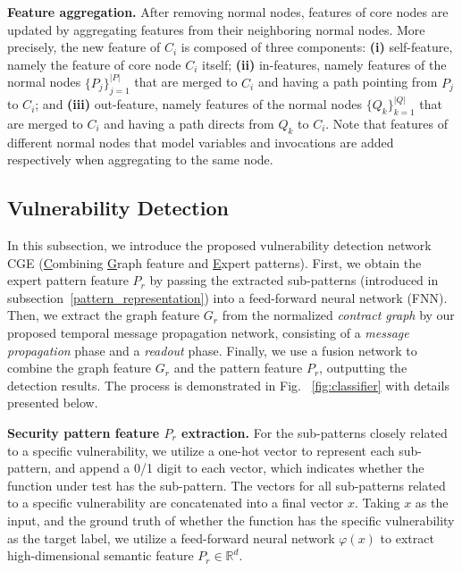 \textbf{Feature aggregation.} After removing normal nodes, features of core nodes are updated by aggregating features from their neighboring normal nodes. More precisely, the new feature of $C_i$ is composed of three components: \textbf{(i)} self-feature, namely the feature of core node $C_i$ itself; \textbf{(ii)} in-features, namely features of the normal nodes $\{P_{j}\}^{|P|}_{j=1}$ that are merged to $C_i$ and having a path pointing from $P_{j}$ to $C_i$; and \textbf{(iii)} out-feature, namely features of the normal nodes $\{Q_{k}\}^{|Q|}_{k=1}$ that are merged to $C_i$ and having a path directs from $Q_{k}$ to $C_i$. Note that features of different normal nodes that model variables and invocations are added respectively when aggregating to the same node.

\vspace{-0.7em}
\subsection{Vulnerability Detection} 
\label{vulnerability_detection}
In this subsection, we introduce the proposed vulnerability detection network CGE (\underline{C}ombining \underline{G}raph feature and \underline{E}xpert patterns). First, we obtain the expert pattern feature $P_{r}$ by passing the extracted sub-patterns (introduced in subsection~\ref{pattern_representation}) into a feed-forward neural network (FNN). Then, we extract the graph feature $G_{r}$ from the normalized \emph{contract graph} by our proposed temporal message propagation network, consisting of a \emph{message propagation} phase and a \emph{readout} phase. Finally, we use a fusion network to combine the graph feature $G_{r}$ and the pattern feature $P_{r}$, outputting the detection results. The process is demonstrated in Fig. ~\ref{fig:classifier} with details presented below.

\textbf{Security pattern feature $P_{r}$ extraction.} For the sub-patterns closely related to a specific vulnerability, we utilize a one-hot vector to represent each sub-pattern, and append a 0/1 digit to each vector, which indicates whether the function under test has the sub-pattern. The vectors for all sub-patterns related to a specific vulnerability are concatenated into a final vector $x$. Taking $x$ as the input, and the ground truth  of whether the function has the specific vulnerability as the target label, we utilize a feed-forward neural network $\varphi (x) $ to extract high-dimensional semantic feature $P_{r} \in \mathbb{R}^{d}$. 


